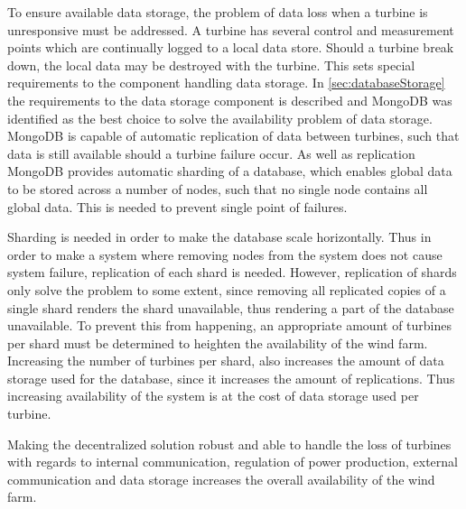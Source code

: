 To ensure available data storage, the problem of data loss when a turbine is unresponsive must be addressed. A turbine has several control and measurement points which are continually logged to a local data store. Should a turbine break down, the local data may be destroyed with the turbine. This sets special requirements to the component handling data storage. In \cref{sec:databaseStorage} the requirements to the data storage component is described and MongoDB was identified as the best choice to solve the availability problem of data storage. MongoDB is capable of automatic replication of data between turbines, such that data is still available should a turbine failure occur. As well as replication MongoDB provides automatic sharding of a database, which enables global data to be stored across a number of nodes, such that no single node contains all global data. This is needed to prevent single point of failures. 

Sharding is needed in order to make the database scale horizontally. Thus in order to make a system where removing nodes from the system does not cause system failure, replication of each shard is needed. However, replication of shards only solve the problem to some extent, since removing all replicated copies of a single shard renders the shard unavailable, thus rendering a part of the database unavailable. To prevent this from happening, an appropriate amount of turbines per shard must be determined to heighten the availability of the wind farm. Increasing the number of turbines per shard, also increases the amount of data storage used for the database, since it increases the amount of replications. Thus increasing availability of the system is at the cost of data storage used per turbine.

Making the decentralized solution robust and able to handle the loss of turbines with regards to internal communication, regulation of power production, external communication and data storage increases the overall availability of the wind farm. %

\clearpage